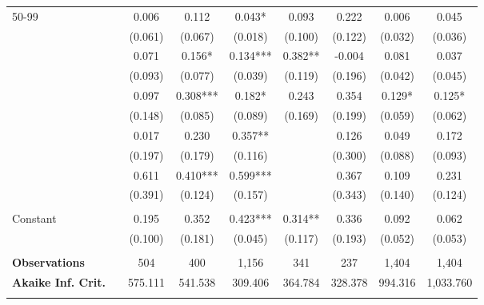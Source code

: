 \begin{tabular*}{\linewidth}{@{\extracolsep{\fill} } llccccccc}
\multirow{2}{*}{\hspace{0.2cm}50{-}99}&&0.006&0.112&0.043*&0.093&0.222&0.006&0.045\\%
&&(0.061)&(0.067)&(0.018)&(0.100)&(0.122)&(0.032)&(0.036)\\%
\arrayrulecolor{white}%
\hline%
\arrayrulecolor{white}%
\hline%
\arrayrulecolor{white}%
\hline%
\arrayrulecolor{white}%
\hline%
\arrayrulecolor{white}%
\hline%
\multirow{2}{*}{\hspace{0.2cm}100{-}199}&&0.071&0.156*&0.134***&0.382**&{-}0.004&0.081&0.037\\%
&&(0.093)&(0.077)&(0.039)&(0.119)&(0.196)&(0.042)&(0.045)\\%
\arrayrulecolor{white}%
\hline%
\arrayrulecolor{white}%
\hline%
\arrayrulecolor{white}%
\hline%
\arrayrulecolor{white}%
\hline%
\arrayrulecolor{white}%
\hline%
\multirow{2}{*}{\hspace{0.2cm}200{-}299}&&0.097&0.308***&0.182*&0.243&0.354&0.129*&0.125*\\%
&&(0.148)&(0.085)&(0.089)&(0.169)&(0.199)&(0.059)&(0.062)\\%
\arrayrulecolor{white}%
\hline%
\arrayrulecolor{white}%
\hline%
\arrayrulecolor{white}%
\hline%
\arrayrulecolor{white}%
\hline%
\arrayrulecolor{white}%
\hline%
\multirow{2}{*}{\hspace{0.2cm}300{-}399}&&0.017&0.230&0.357**&&0.126&0.049&0.172\\%
&&(0.197)&(0.179)&(0.116)&&(0.300)&(0.088)&(0.093)\\%
\arrayrulecolor{white}%
\hline%
\arrayrulecolor{white}%
\hline%
\arrayrulecolor{white}%
\hline%
\arrayrulecolor{white}%
\hline%
\arrayrulecolor{white}%
\hline%
\multirow{2}{*}{\hspace{0.2cm}400+}&&0.611&0.410***&0.599***&&0.367&0.109&0.231\\%
&&(0.391)&(0.124)&(0.157)&&(0.343)&(0.140)&(0.124)\\%
\arrayrulecolor{white}%
\hline%
\arrayrulecolor{white}%
\hline%
\arrayrulecolor{white}%
\hline%
\arrayrulecolor{white}%
\hline%
\arrayrulecolor{white}%
\hline%
&&&&&&&&\\%
\multirow{2}{*}{Constant}&&0.195&0.352&0.423***&0.314**&0.336&0.092&0.062\\%
&&(0.100)&(0.181)&(0.045)&(0.117)&(0.193)&(0.052)&(0.053)\\%
\arrayrulecolor{white}%
\hline%
\arrayrulecolor{white}%
\hline%
\arrayrulecolor{white}%
\hline%
\arrayrulecolor{white}%
\hline%
\arrayrulecolor{white}%
\hline%
&&&&&&&&\\%
\bfseries Observations&&504&400&1,156&341&237&1,404&1,404\\%
\bfseries Akaike Inf. Crit.&&575.111&541.538&309.406&364.784&328.378&994.316&1,033.760\\%
\arrayrulecolor{white}%
\hline%
\arrayrulecolor{white}%
\hline%
\arrayrulecolor{white}%
\hline%
\arrayrulecolor{white}%
\hline%
\arrayrulecolor{white}%
\hline%
\arrayrulecolor{black}%
\hline%
\end{tabular*}